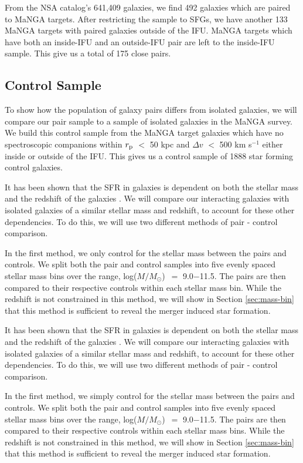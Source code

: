\documentclass[iop,revtex4,twocolumn,apj,numberedappendix,appendixfloats]{emulateapj}
\newcommand{\logm}{log($M/M_{\odot}$)}
\begin{document}
From the NSA catalog's 641,409 galaxies, we find 492 galaxies which are paired to MaNGA targets. After restricting the sample to SFGs, we have another 133 MaNGA targets with paired galaxies outside of the IFU. MaNGA targets which have both an inside-IFU and an outside-IFU pair are left to the inside-IFU sample. This give us a total of 175 close pairs.

\subsection{Control Sample}\label{sec:control}

To show how the population of galaxy pairs differs from isolated galaxies, we will compare our pair sample to a sample of isolated galaxies in the MaNGA survey. We build this control sample from the MaNGA target galaxies which have no spectroscopic companions within $r_{\rm p}$ $<$ 50 kpc and $\Delta v$ $<$ 500 km s$^{-1}$ either inside or outside of the IFU. This gives us a control sample of 1888 star forming control galaxies. 

It has been shown that the SFR in galaxies is dependent on both the stellar mass and the redshift of the galaxies \citep{Noeske:2007}. We will compare our interacting galaxies with isolated galaxies of a similar stellar mass and redshift, to account for these other dependencies. To do this, we will use two different methods of pair - control comparison. 

In the first method, we only control for the stellar mass between the pairs and controls. We split both the pair and control samples into five evenly spaced stellar mass bins over the range, \logm\ $=$ 9.0$-$11.5. The pairs are then compared to their respective controls within each stellar mass bin. While the redshift is not constrained in this method, we will show in Section \ref{sec:mass-bin} that this method is sufficient to reveal the merger induced star formation. 

It has been shown that the SFR in galaxies is dependent on both the stellar mass and the redshift of the galaxies \citep[e.g.,][]{Noeske:2007}. We will compare our interacting galaxies with isolated galaxies of a similar stellar mass and redshift, to account for these other dependencies. To do this, we will use two different methods of pair - control comparison. 

In the first method, we simply control for the stellar mass between the pairs and controls. We split both the pair and control samples into five evenly spaced stellar mass bins over the range, \logm\ $=$ 9.0$-$11.5. The pairs are then compared to their respective controls within each stellar mass bins. While the redshift is not constrained in this method, we will show in Section \ref{sec:mass-bin} that this method is sufficient to reveal the merger induced star formation. 
\end{document}

